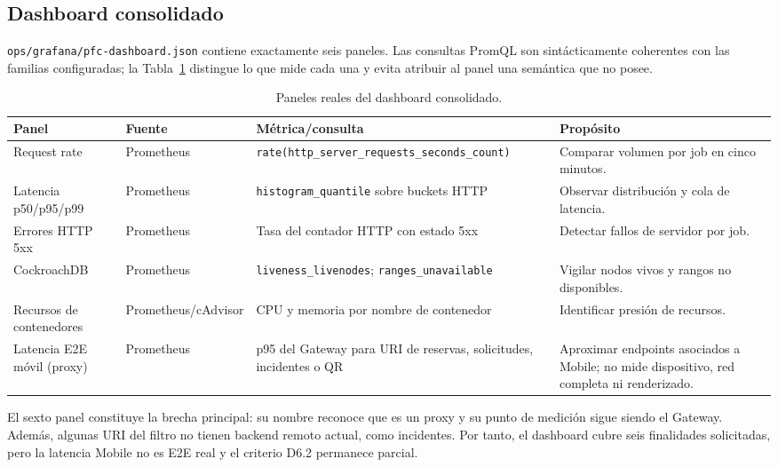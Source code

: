 \subsection{Dashboard consolidado}
\label{subsec:dashboard-grafana}

\texttt{ops/grafana/pfc-dashboard.json} contiene exactamente seis paneles. Las
consultas PromQL son sintácticamente coherentes con las familias configuradas;
la Tabla~\ref{tab:paneles-grafana} distingue lo que mide cada una y evita
atribuir al panel una semántica que no posee.

\begin{table}[ht]
  \centering
  \small
  \caption{Paneles reales del dashboard consolidado.}
  \label{tab:paneles-grafana}
  \begin{tabular}{|p{3.0cm}|p{2.0cm}|p{3.6cm}|p{3.8cm}|}
    \hline
    \textbf{Panel} & \textbf{Fuente} & \textbf{Métrica/consulta} & \textbf{Propósito} \\
    \hline
    Request rate & Prometheus & \texttt{rate(http\_server\_requests\_seconds\_count)} & Comparar volumen por job en cinco minutos. \\
    \hline
    Latencia p50/p95/p99 & Prometheus & \texttt{histogram\_quantile} sobre buckets HTTP & Observar distribución y cola de latencia. \\
    \hline
    Errores HTTP 5xx & Prometheus & Tasa del contador HTTP con estado 5xx & Detectar fallos de servidor por job. \\
    \hline
    CockroachDB & Prometheus & \texttt{liveness\_livenodes}; \texttt{ranges\_unavailable} & Vigilar nodos vivos y rangos no disponibles. \\
    \hline
    Recursos de contenedores & Prometheus/cAdvisor & CPU y memoria por nombre de contenedor & Identificar presión de recursos. \\
    \hline
    Latencia E2E móvil (proxy) & Prometheus & p95 del Gateway para URI de reservas, solicitudes, incidentes o QR & Aproximar endpoints asociados a Mobile; no mide dispositivo, red completa ni renderizado. \\
    \hline
  \end{tabular}
\end{table}

El sexto panel constituye la brecha principal: su nombre reconoce que es un
proxy y su punto de medición sigue siendo el Gateway. Además, algunas URI del
filtro no tienen backend remoto actual, como incidentes. Por tanto, el dashboard
cubre seis finalidades solicitadas, pero la latencia Mobile no es E2E real y el
criterio D6.2 permanece parcial.

